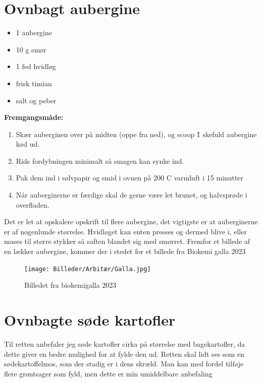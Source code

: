 \documentclass{book}
\begin{document}
\section{Ovnbagt aubergine}
\begin{minipage}[t]{0.5\textwidth}
\begin{itemize}
    \item 1 aubergine
    \item 10 g smør
    \item 1 fed hvidløg
    \item frisk timian
    \item salt og peber
\end{itemize}
\end{minipage}
\begin{minipage}[t]{0.5\textwidth}
\textbf{Fremgangsmåde:}
\begin{enumerate}
    \item Skær auberginen over på midten (oppe fra ned), og scoop \~ 1 skefuld aubergine kød ud.
    \item Rids fordybningen minimalt så smagen kan synke ind.
    \item Pak dem ind i sølvpapir og smid i ovnen på 200 \degree C varmluft i 15 minutter
    \item Når auberginerne er færdige skal de gerne være let brunet, og halvsprøde i overfladen.
\end{enumerate}
\end{minipage}
Det er let at opskalere opskrift til flere aubergine, det vigtigste er at auberginerne er af nogenlunde størrelse. Hvidløget kan enten presses og dermed blive i, eller mases til større stykker så saften blandet sig med smørret.
\newpage 
Fremfor et billede af en lækker aubergine, kommer der i stedet for et billede fra Biokemi galla 2023
\begin{figure}
    \centering
    \texttt{[image: Billeder/Arbitær/Galla.jpg]}
    \caption{Billedet fra biokemigalla 2023}
\end{figure}
\newpage \section{Ovnbagte søde kartofler}
Til retten anbefaler jeg søde kartofler cirka på størrelse med bagekartofler, da dette giver en bedre mulighed for at fylde den ud. Retten skal lidt ses som en sødekartoffelmos, som der stadig er i dens skræld. Man kan med fordel tilføje flere grøntsager som fyld, men dette er min umiddelbare anbefaling\\
\end{document}
